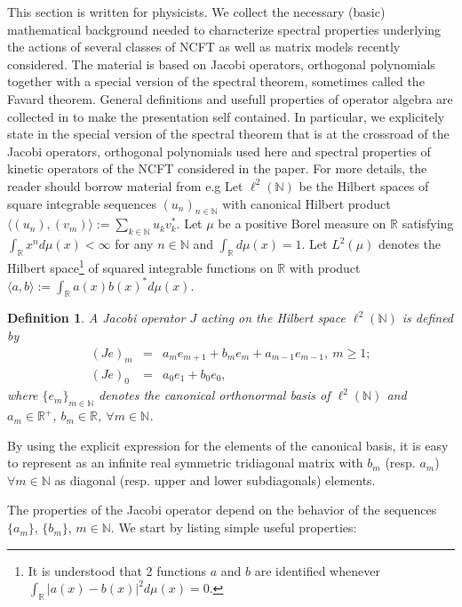 \documentclass[10pt]{book}
\let\int\int
\theoremstyle{break}
\newtheorem{definition}{Definition}
\begin{document}
This section is written for physicists. We collect the necessary (basic) mathematical background needed to characterize spectral properties underlying the actions of several classes of NCFT as well as matrix models recently considered. The material is based on Jacobi operators, orthogonal polynomials together with a special version of the spectral theorem, sometimes called the Favard theorem. General definitions and usefull properties of operator algebra are collected in %
to make the presentation self contained. In particular, we explicitely state in %
the special version of the spectral theorem that is at the crossroad of the Jacobi operators, orthogonal polynomials used here and spectral properties of kinetic operators of the NCFT considered in the paper. For more details, the reader should borrow material from e.g %
Let $\ell^2(\mathbb{N})$ be the Hilbert spaces of square integrable sequences $(u_n)_{n\in\mathbb{N}}$ with canonical Hilbert product $\langle (u_n),(v_m)\rangle:=\sum_{k\in\mathbb{N}}u_kv_k^*$. Let $\mu$ be a positive Borel measure on $\mathbb{R}$ satisfying $\int_\mathbb{R} x^nd\mu(x)<\infty$ for any $n\in\mathbb{N}$ and $\int_\mathbb{R} d\mu(x)=1$. Let $L^2(\mu)$ denotes the Hilbert space{\footnote{It is understood that 2 functions $a$ and $b$ are identified whenever $\int_\mathbb{R}\vert a(x)-b(x) \vert^2d\mu(x)=0$.}} of squared integrable functions on $\mathbb{R}$ with product $\langle a,b\rangle:=\int_\mathbb{R}a(x)b(x)^*d\mu(x)$. 
\begin{definition}
A Jacobi operator $J$ acting on the Hilbert space $\ell^2(\mathbb{N})$ is defined by
\begin{eqnarray}
(Je)_m&=&a_me_{m+1}+b_me_m+a_{m-1}e_{m-1},\ m\ge1;\nonumber\\ 
(Je)_0&=&a_0e_1+b_0e_0,
\end{eqnarray}
where $\{e_m\}_{m\in\mathbb{N}}$ denotes the canonical orthonormal basis of $\ell^2(\mathbb{N})$ and $a_m\in\mathbb{R}^+$, $b_m\in\mathbb{R}$, $\forall m\in\mathbb{N}$.
\end{definition}
By using the explicit expression for the elements of the canonical basis, it is easy to represent %
as an infinite real symmetric tridiagonal matrix with $b_m$ (resp. $a_m$) $\forall m\in\mathbb{N}$ as diagonal (resp. upper and lower subdiagonals) elements. \par 
The properties of the Jacobi operator depend on the behavior of the sequences $\{a_m\}$, $\{b_m\}$, $m\in\mathbb{N}$. We start by listing simple useful properties:
\end{document}
